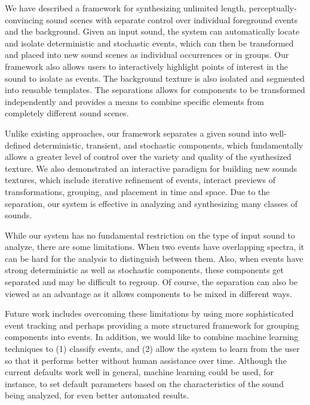 \documentclass{acmsiggraph}               %
\begin{document}
We have described a framework for synthesizing unlimited length, perceptually-convincing 
sound scenes with separate control over individual foreground events and the background.  
Given an input sound, the system can automatically locate and isolate deterministic 
and stochastic events, which can then be transformed and placed into new sound scenes 
as individual occurrences or in groups.  Our framework 
also allows users to interactively highlight points of interest in the sound to isolate as 
events.  The background texture is also isolated and segmented into reusable templates.  The 
separations allows for components to be transformed independently and provides a means to 
combine specific elements from completely different sound scenes.

Unlike existing approaches, our framework separates a given sound into well-defined 
deterministic, transient, and stochastic components, which fundamentally allows a greater 
level of control over the variety and quality of the synthesized texture.
We also demonstrated an interactive paradigm for building new sounds textures, which include 
iterative refinement of events, interact previews of transformations, grouping, and placement 
in time and space.  Due to the separation, our system is effective in analyzing and 
synthesizing many classes of sounds. %

While our system has no fundamental restriction on the type of input sound to analyze,
there are some limitations. When two events have overlapping spectra, it can be hard for the
analysis to distinguish between them. Also, when events have strong deterministic as well as stochastic components, these components get separated and may be difficult to regroup. 
Of course, the separation can also be viewed as an advantage as it allows components to be mixed in different ways. 

Future work includes overcoming these limitations by using more sophisticated event tracking and perhaps providing a more structured framework for grouping components into events. In addition, we would like to combine machine learning techniques to (1) classify events, and (2) allow the system to learn from the user so that it performs better without human assistance over time. Although the current defaults work well in general, machine learning could be used, for instance, to set default parameters based on the characteristics of the sound being analyzed, for even better automated results. 


\nocite{*}

\end{document}
